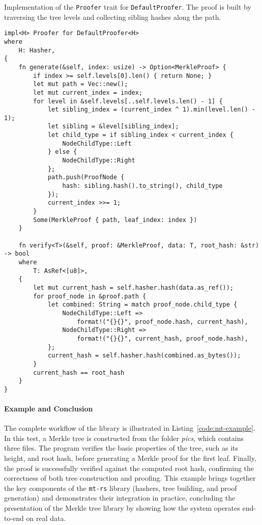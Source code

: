 \begin{listing}[!htp]
\caption{Implementation of the \texttt{Proofer} trait for \texttt{DefaultProofer}. The proof is built by traversing the tree levels and collecting sibling hashes along the path.}
\label{code:default-proofer}
\begin{verbatim}
impl<H> Proofer for DefaultProofer<H>
where
    H: Hasher,
{
    fn generate(&self, index: usize) -> Option<MerkleProof> {
        if index >= self.levels[0].len() { return None; }
        let mut path = Vec::new();
        let mut current_index = index;
        for level in &self.levels[..self.levels.len() - 1] {
            let sibling_index = (current_index ^ 1).min(level.len() - 1);
            let sibling = &level[sibling_index];
            let child_type = if sibling_index < current_index {
                NodeChildType::Left
            } else {
                NodeChildType::Right
            };
            path.push(ProofNode {
                hash: sibling.hash().to_string(), child_type 
            });
            current_index >>= 1;
        }
        Some(MerkleProof { path, leaf_index: index })
    }

    fn verify<T>(&self, proof: &MerkleProof, data: T, root_hash: &str) -> bool
    where
        T: AsRef<[u8]>,
    {
        let mut current_hash = self.hasher.hash(data.as_ref());
        for proof_node in &proof.path {
            let combined: String = match proof_node.child_type {
                NodeChildType::Left => 
                    format!("{}{}", proof_node.hash, current_hash),
                NodeChildType::Right => 
                    format!("{}{}", current_hash, proof_node.hash),
            };
            current_hash = self.hasher.hash(combined.as_bytes());
        }
        current_hash == root_hash
    }
}
\end{verbatim}
\end{listing}

\newpage

\paragraph{Example and Conclusion}  
The complete workflow of the library is illustrated in Listing~\ref{code:mt-example}.
In this test, a Merkle tree is constructed from the folder \emph{pics}, which contains three files. The program verifies the basic properties of the tree, such as its height, and root hash, before generating a Merkle proof for the first leaf.  
Finally, the proof is successfully verified against the computed root hash, confirming the correctness of both tree construction and proofing. This example brings together the key components of the \texttt{mt-rs} library (hashers, tree building, and proof generation) and demonstrates their integration in practice, concluding the presentation of the Merkle tree library by showing how the system operates end-to-end on real data.


